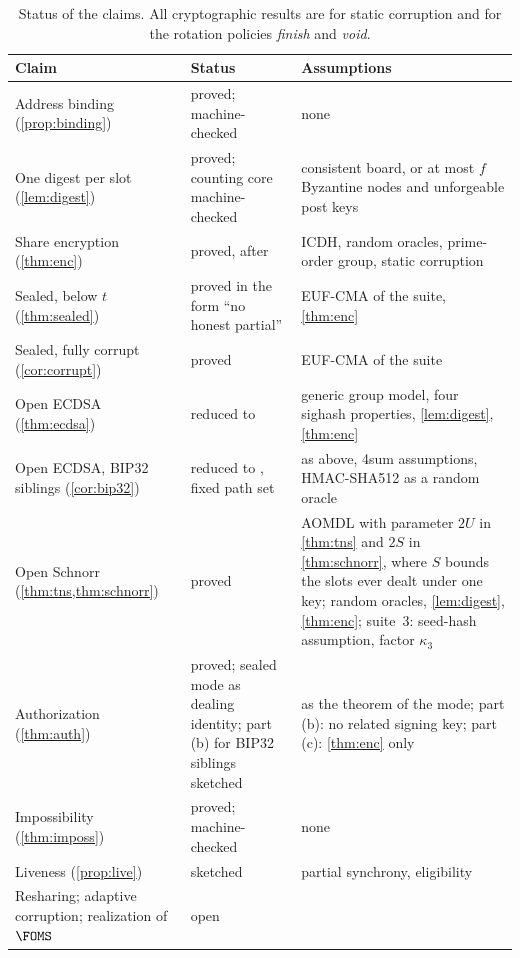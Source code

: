 \begin{table}[t]
\centering
\small
\begin{tabularx}{\linewidth}{@{}l>{\raggedright\arraybackslash}X>{\raggedright\arraybackslash}X@{}}
\toprule
Claim & Status & Assumptions \\
\midrule
Address binding (\cref{prop:binding}) & proved; machine-checked & none \\
One digest per slot (\cref{lem:digest}) & proved; counting core machine-checked & consistent board, or at most $f$ Byzantine nodes and unforgeable post keys \\
Share encryption (\cref{thm:enc}) & proved, after \cite[Theorem~2]{GS22} & ICDH, random oracles, prime-order group, static corruption \\
Sealed, below $t$ (\cref{thm:sealed}) & proved in the form ``no honest partial'' & EUF-CMA of the suite, \cref{thm:enc} \\
Sealed, fully corrupt (\cref{cor:corrupt}) & proved & EUF-CMA of the suite \\
Open ECDSA (\cref{thm:ecdsa}) & reduced to \cite[Theorem~3]{GS21} & generic group model, four sighash properties, \cref{lem:digest}, \cref{thm:enc} \\
Open ECDSA, BIP32 siblings (\cref{cor:bip32}) & reduced to \cite[Theorem~4]{GS21}, fixed path set & as above, 4sum assumptions, HMAC-SHA512 as a random oracle \\
Open Schnorr (\cref{thm:tns,thm:schnorr}) & proved & AOMDL with parameter $2U$ in \cref{thm:tns} and $2S$ in \cref{thm:schnorr}, where $S$ bounds the slots ever dealt under one key; random oracles, \cref{lem:digest}, \cref{thm:enc}; suite~3: seed-hash assumption, factor $\kappa_3$ \\
Authorization (\cref{thm:auth}) & proved; sealed mode as dealing identity; part (b) for BIP32 siblings sketched & as the theorem of the mode; part (b): no related signing key; part (c): \cref{thm:enc} only \\
Impossibility (\cref{thm:imposs}) & proved; machine-checked & none \\
Liveness (\cref{prop:live}) & sketched & partial synchrony, eligibility \\
Resharing; adaptive corruption; realization of $\FOMS$ & open & \\
\bottomrule
\end{tabularx}
\caption{Status of the claims. All cryptographic results are for static corruption and for the rotation policies \emph{finish} and \emph{void}.}
\label{tab:status}
\end{table}

